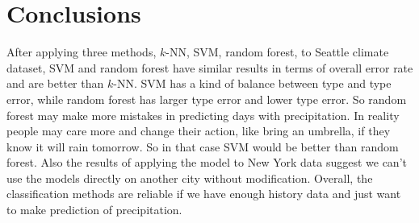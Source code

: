 \section{Conclusions}

After applying three methods, $k$-NN, SVM, random forest, to Seattle climate dataset, SVM and random forest have similar results in terms of overall error rate and are better than $k$-NN. SVM has a kind of balance between type \uppercase\expandafter{} and type \uppercase\expandafter{} error, while random forest has larger type \uppercase\expandafter{} error and lower type \uppercase\expandafter{} error. So random forest may make more mistakes in predicting days with precipitation. In reality people may care more and change their action, like bring an umbrella, if they know it will rain tomorrow. So in that case SVM would be better than random forest. Also the results of applying the model to New York data suggest we can’t use the models directly on another city without modification. Overall, the classification methods are reliable if we have enough history data and just want to make prediction of precipitation. 